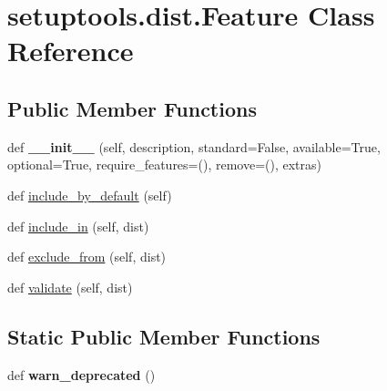 \hypertarget{classsetuptools_1_1dist_1_1_feature}{}\section{setuptools.\+dist.\+Feature Class Reference}
\label{classsetuptools_1_1dist_1_1_feature}
\subsection*{Public Member Functions}
\begin{DoxyCompactItemize}
\item 
\mbox{\label{classsetuptools_1_1dist_1_1_feature_a160df35a075c78ef2a7732bce650dded}} 
def {\bfseries \+\_\+\+\_\+init\+\_\+\+\_\+} (self, description, standard=False, available=True, optional=True, require\+\_\+features=(), remove=(), extras)
\item 
def \hyperlink{classsetuptools_1_1dist_1_1_feature_ac3896cc19837e04ab7b51a01368c9c7a}{include\+\_\+by\+\_\+default} (self)
\item 
def \hyperlink{classsetuptools_1_1dist_1_1_feature_a02c6d97eea9aa58d36a60fa33dac0b97}{include\+\_\+in} (self, dist)
\item 
def \hyperlink{classsetuptools_1_1dist_1_1_feature_aa7bf364cf012b0da64fa1a6c54af8930}{exclude\+\_\+from} (self, dist)
\item 
def \hyperlink{classsetuptools_1_1dist_1_1_feature_a4d60dcf37f70c14ee94f92a3dd1a9e2c}{validate} (self, dist)
\end{DoxyCompactItemize}
\subsection*{Static Public Member Functions}
\begin{DoxyCompactItemize}
\item 
\mbox{\label{classsetuptools_1_1dist_1_1_feature_a43b491899fabc23f5a6078805d8ad2fb}} 
def {\bfseries warn\+\_\+deprecated} ()
\end{DoxyCompactItemize}
